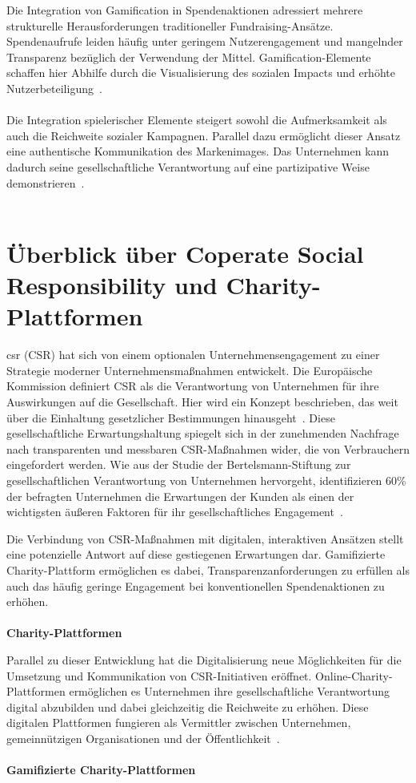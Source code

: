 Die Integration von Gamification in Spendenaktionen adressiert mehrere strukturelle Herausforderungen traditioneller Fundraising-Ansätze.
Spendenaufrufe leiden häufig unter geringem Nutzerengagement und mangelnder Transparenz bezüglich der Verwendung der Mittel.
Gamification-Elemente schaffen hier Abhilfe durch die Visualisierung des sozialen Impacts und erhöhte Nutzerbeteiligung~\cite{golrang2021applying}.
\\\\
Die Integration spielerischer Elemente steigert sowohl die Aufmerksamkeit als auch die Reichweite sozialer Kampagnen.
Parallel dazu ermöglicht dieser Ansatz eine authentische Kommunikation des Markenimages.
Das Unternehmen kann dadurch seine gesellschaftliche Verantwortung auf eine partizipative Weise demonstrieren~\cite{golrang2021applying}.
\\\\
\section{Überblick über Coperate Social Responsibility und Charity-Plattformen}
\gls{csr} (CSR) hat sich von einem optionalen Unternehmensengagement zu einer Strategie moderner Unternehmensmaßnahmen entwickelt.
Die Europäische Kommission definiert CSR als die Verantwortung von Unternehmen für ihre Auswirkungen auf die Gesellschaft.
Hier wird ein Konzept beschrieben, das weit über die Einhaltung gesetzlicher Bestimmungen hinausgeht~\cite{european_commission2011csr}.
Diese gesellschaftliche Erwartungshaltung spiegelt sich in der zunehmenden Nachfrage nach transparenten und messbaren CSR-Maßnahmen wider, die von Verbrauchern eingefordert werden.
Wie aus der Studie der Bertelsmann-Stiftung zur gesellschaftlichen Verantwortung von Unternehmen hervorgeht, identifizieren 60\% der befragten Unternehmen die Erwartungen der Kunden als einen der wichtigsten äußeren Faktoren für ihr gesellschaftliches Engagement~\cite{bertelsmann2006gesellschaftliche}.

Die Verbindung von CSR-Maßnahmen mit digitalen, interaktiven Ansätzen stellt eine potenzielle Antwort auf diese gestiegenen Erwartungen dar.
Gamifizierte Charity-Plattform ermöglichen es dabei, Transparenzanforderungen zu erfüllen als auch das häufig geringe Engagement bei konventionellen Spendenaktionen zu erhöhen.
\\\\
\textbf{Charity-Plattformen}

Parallel zu dieser Entwicklung hat die Digitalisierung neue Möglichkeiten für die Umsetzung und Kommunikation von CSR-Initiativen eröffnet.
Online-Charity-Plattformen ermöglichen es Unternehmen ihre gesellschaftliche Verantwortung digital abzubilden und dabei gleichzeitig die Reichweite zu erhöhen.
Diese digitalen Plattformen fungieren als Vermittler zwischen Unternehmen, gemeinnützigen Organisationen und der Öffentlichkeit~\cite{csr40_2020}.
\\\\
\textbf{Gamifizierte Charity-Plattformen}

